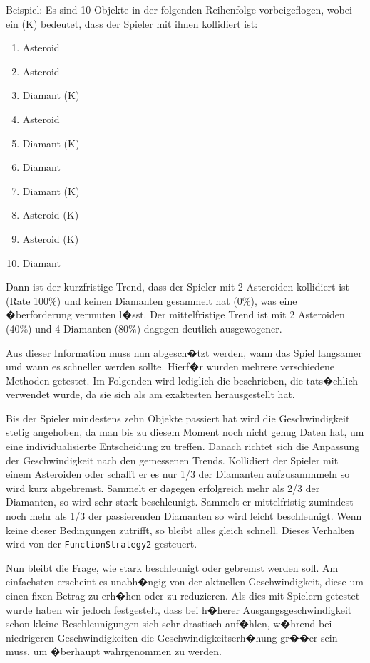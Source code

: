 \documentclass[a4paper,12pt]{scrartcl}
\newcommand*{\code}[1]{\texttt{#1}}%
\begin{document}
Beispiel: Es sind 10 Objekte in der folgenden Reihenfolge vorbeigeflogen, wobei ein (K)
bedeutet, dass der Spieler mit ihnen kollidiert ist:
\begin{enumerate}
\item Asteroid
\item Asteroid
\item Diamant (K)
\item Asteroid
\item Diamant (K)
\item Diamant
\item Diamant (K)
\item Asteroid (K)
\item Asteroid (K)
\item Diamant
\end{enumerate}
Dann ist der kurzfristige Trend, dass der Spieler mit 2 Asteroiden kollidiert
ist (Rate 100\%) und keinen Diamanten gesammelt hat (0\%), was eine �berforderung vermuten l�sst.
Der mittelfristige Trend ist mit 2 Asteroiden (40\%) und 4 Diamanten (80\%)
dagegen deutlich ausgewogener.

Aus dieser Information muss nun abgesch�tzt werden, wann das Spiel langsamer und wann
es schneller werden sollte. Hierf�r wurden mehrere verschiedene Methoden getestet. Im
Folgenden wird lediglich die beschrieben, die tats�chlich verwendet wurde, da sie sich als
am exaktesten herausgestellt hat.

Bis der Spieler mindestens zehn Objekte passiert hat wird die Geschwindigkeit stetig
angehoben, da man bis zu diesem Moment noch nicht genug Daten hat, um
eine individualisierte Entscheidung zu treffen. Danach richtet sich die Anpassung der
Geschwindigkeit nach den gemessenen Trends. Kollidiert der Spieler mit einem Asteroiden
oder schafft er es nur 1/3 der Diamanten aufzusammmeln so wird kurz abgebremst.
Sammelt er dagegen erfolgreich mehr als 2/3 der Diamanten, so wird sehr stark
beschleunigt. Sammelt er mittelfristig zumindest noch mehr als 1/3 der
passierenden Diamanten so wird leicht beschleunigt. Wenn keine dieser Bedingungen zutrifft,
so bleibt alles gleich schnell. Dieses Verhalten wird von der \code{FunctionStrategy2} gesteuert.

Nun bleibt die Frage, wie stark beschleunigt oder gebremst werden soll. Am einfachsten
erscheint es unabh�ngig von der aktuellen Geschwindigkeit, diese um einen fixen Betrag
zu erh�hen oder zu reduzieren. Als dies mit Spielern getestet wurde haben wir jedoch
festgestelt, dass bei h�herer Ausgangsgeschwindigkeit schon kleine Beschleunigungen
sich sehr drastisch anf�hlen, w�hrend bei niedrigeren Geschwindigkeiten die
Geschwindigkeitserh�hung gr��er sein muss, um �berhaupt wahrgenommen zu werden.
\end{document}
